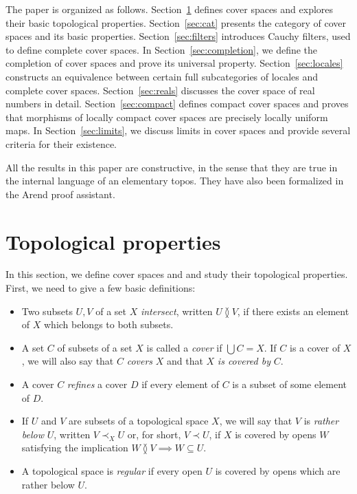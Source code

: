 \documentclass[reqno]{amsart}
\theoremstyle{definition}
\theoremstyle{remark}
\numberwithin{figure}{section}
\newcommand{\overlap}[2]{#1 \between #2}
\newcommand{\rb}{\prec}
\begin{document}
The paper is organized as follows.
Section~\ref{sec:top} defines cover spaces and explores their basic topological properties.
Section~\ref{sec:cat} presents the category of cover spaces and its basic properties.
Section~\ref{sec:filters} introduces Cauchy filters, used to define complete cover spaces.
In Section~\ref{sec:completion}, we define the completion of cover spaces and prove its universal property.
Section~\ref{sec:locales} constructs an equivalence between certain full subcategories of locales and complete cover spaces.
Section~\ref{sec:reals} discusses the cover space of real numbers in detail. 
Section~\ref{sec:compact} defines compact cover spaces and proves that morphisms of locally compact cover spaces are precisely locally uniform maps.
In Section~\ref{sec:limits}, we discuss limits in cover spaces and provide several criteria for their existence.

All the results in this paper are constructive, in the sense that they are true in the internal language of an elementary topos.
They have also been formalized in the Arend proof assistant.

\section{Topological properties}
\label{sec:top}

In this section, we define cover spaces and and study their topological properties.
First, we need to give a few basic definitions:
\begin{itemize}
\item Two subsets $U,V$ of a set $X$ \emph{intersect}, written $\overlap{U}{V}$, if there exists an element of $X$ which belongs to both subsets.
\item A set $C$ of subsets of a set $X$ is called a \emph{cover} if $\bigcup C = X$. If $C$ is a cover of $X$, we will also say that $C$ \emph{covers} $X$ and that $X$ \emph{is covered by} $C$.
\item A cover $C$ \emph{refines} a cover $D$ if every element of $C$ is a subset of some element of $D$.
\item If $U$ and $V$ are subsets of a topological space $X$, we will say that $V$ is \emph{rather below} $U$, written $V \rb_X U$ or, for short, $V \rb U$, if $X$ is covered by opens $W$ satisfying the implication $\overlap{W}{V} \implies W \subseteq U$.
\item A topological space is \emph{regular} if every open $U$ is covered by opens which are rather below $U$.
\end{itemize}
\end{document}
